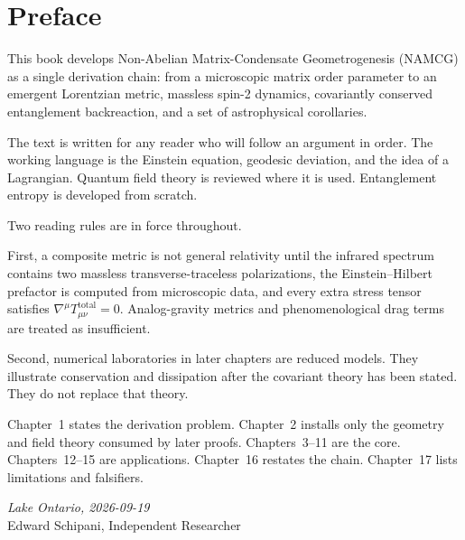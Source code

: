 \chapter{Preface}

This book develops Non-Abelian Matrix-Condensate Geometrogenesis
(NAMCG) as a single derivation chain: from a microscopic matrix order
parameter to an emergent Lorentzian metric, massless spin-2 dynamics,
covariantly conserved entanglement backreaction, and a set of
astrophysical corollaries.

The text is written for any reader who will follow an argument
in order. The working language is the Einstein equation, geodesic
deviation, and the idea of a Lagrangian. Quantum field theory is
reviewed where it is used. Entanglement entropy is developed from
scratch.

Two reading rules are in force throughout.

First, a composite metric is not general relativity until the infrared
spectrum contains two massless transverse-traceless polarizations, the
Einstein--Hilbert prefactor is computed from microscopic data, and every
extra stress tensor satisfies
\(\nabla^\mu T_{\mu\nu}^{\mathrm{total}}=0\). Analog-gravity metrics and
phenomenological drag terms are treated as insufficient.

Second, numerical laboratories in later chapters are reduced models.
They illustrate conservation and dissipation after the covariant theory
has been stated. They do not replace that theory.

Chapter~1 states the derivation problem. Chapter~2 installs only the
geometry and field theory consumed by later proofs. Chapters~3--11 are
the core. Chapters~12--15 are applications. Chapter~16 restates the
chain. Chapter~17 lists limitations and falsifiers.

\vspace{1.5em}
\noindent\textit{Lake Ontario, 2026-09-19}\\
Edward Schipani, Independent Researcher